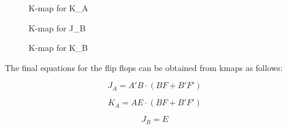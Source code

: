 \documentclass[table ]{article}
\begin{document}
\begin{figure}[H]
    \centering
    \begin{karnaugh-map}[4][4][1][$F$][$E$][$B$][$A$]
    \end{karnaugh-map}
    
    
    \caption{K-map for K\_A}
    \label{fig:kmap_ka}
    \end{figure}




\begin{figure}[H]
    \centering
    \begin{karnaugh-map}[4][4][1][$F$][$E$][$B$][$A$]
    \end{karnaugh-map}
    
    
    \caption{K-map for J\_B}
    \label{fig:kmap_jb}
    \end{figure}


\begin{figure}[H]
    \centering
    \begin{karnaugh-map}[4][4][1][$F$][$E$][$B$][$A$]

        
    \end{karnaugh-map}
    
    \caption{K-map for K\_B}
    \label{fig:kmap_kb}
    \end{figure}


The final equations for the flip flops can be obtained from kmaps as follows:

\begin{equation}
    J_A = A'B \cdot (BF + B'F')
\end{equation}

\begin{equation}
    K_A = AE \cdot (BF + B'F')
\end{equation}

\begin{equation}
    J_B = E
\end{equation}
\end{document}
